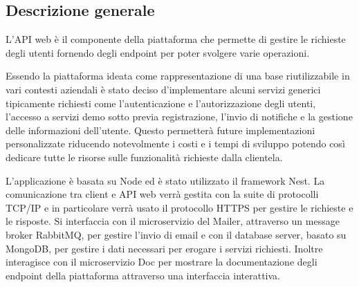 \subsection{Descrizione generale}
L'API web è il componente della piattaforma che permette di gestire le richieste degli utenti fornendo degli
endpoint per poter svolgere varie operazioni.

Essendo la piattaforma ideata come rappresentazione di una base riutilizzabile in vari contesti aziendali è stato deciso d'implementare alcuni servizi
generici tipicamente richiesti come l'autenticazione e l'autorizzazione degli utenti, l'accesso a servizi demo sotto previa registrazione, l'invio di notifiche e
la gestione delle informazioni dell'utente. Questo permetterà future implementazioni personalizzate riducendo notevolmente i costi e i tempi di sviluppo potendo così dedicare
tutte le risorse sulle funzionalità richieste dalla clientela.

L'applicazione è basata su Node ed è stato utilizzato il framework Nest.
La comunicazione tra client e API web verrà gestita con la suite di protocolli TCP/IP e in particolare verrà usato il protocollo HTTPS per gestire
le richieste e le risposte.
Si interfaccia con il microservizio del Mailer, attraverso un message broker RabbitMQ, per gestire l'invio di email e con il database server, basato su MongoDB, per gestire i dati necessari
per erogare i servizi richiesti. Inoltre interagisce con il microservizio Doc per mostrare la documentazione degli endpoint della piattaforma attraverso
una interfaccia interattiva.

